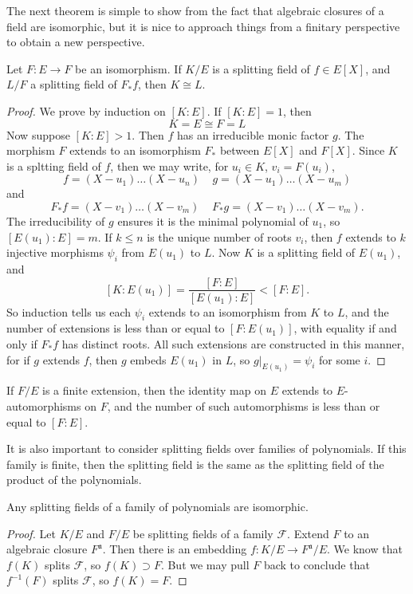 The next theorem is simple to show from the fact that algebraic closures of a field are isomorphic, but it is nice to approach things from a finitary perspective to obtain a new perspective.

\begin{theorem}
    Let $F: E \to F$ be an isomorphism. If $K/E$ is a splitting field of $f \in E[X]$, and $L/F$ a splitting field of $F_* f$, then $K \cong L$.
\end{theorem}
\begin{proof}
    We prove by induction on $[K:E]$. If $[K:E] = 1$, then
    \[ K = E \cong F = L \]
    Now suppose $[K:E] > 1$. Then $f$ has an irreducible monic factor $g$. The morphism $F$ extends to an isomorphism $F_*$ between $E[X]$ and $F[X]$. Since $K$ is a spltting field of $f$, then we may write, for $u_i \in K$, $v_i = F(u_i)$,
    \[ f = (X - u_1) \dots (X - u_n)\ \ \ \ \ g = (X - u_1) \dots (X - u_m) \]
    and
    \[ F_* f = (X - v_1) \dots (X - v_m)\ \ \ \ \ F_* g = (X - v_1) \dots (X - v_m). \]
    The irreducibility of $g$ ensures it is the minimal polynomial of $u_1$, so $[E(u_1): E] = m$. If $k \leq n$ is the unique number of roots $v_i$, then $f$ extends to $k$ injective morphisms $\psi_i$ from $E(u_1)$ to $L$. Now $K$ is a splitting field of $E(u_1)$, and
    \[ [K:E(u_1)] = \frac{[F:E]}{[E(u_1):E]} < [F:E]. \]
    So induction tells us each $\psi_i$ extends to an isomorphism from $K$ to $L$, and the number of extensions is less than or equal to $[F:E(u_1)]$, with equality if and only if $F_* f$ has distinct roots. All such extensions are constructed in this manner, for if $g$ extends $f$, then $g$ embeds $E(u_1)$ in $L$, so $g|_{E(u_1)} = \psi_i$ for some $i$.
\end{proof}

\begin{corollary}
    If $F/E$ is a finite extension, then the identity map on $E$ extends to $E$-automorphisms on $F$, and the number of such automorphisms is less than or equal to $[F:E]$.
\end{corollary}

It is also important to consider splitting fields over families of polynomials. If this family is finite, then the splitting field is the same as the splitting field of the product of the polynomials.

\begin{theorem}
    Any splitting fields of a family of polynomials are isomorphic.
\end{theorem}
\begin{proof}
    Let $K/E$ and $F/E$ be splitting fields of a family $\mathcal{F}$. Extend $F$ to an algebraic closure $F^{\mathfrak{a}}$. Then there is an embedding $f:K/E \to F^{\mathfrak{a}}/E$. We know that $f(K)$ splits $\mathcal{F}$, so $f(K) \supset F$. But we may pull $F$ back to conclude that $f^{-1}(F)$ splits $\mathcal{F}$, so $f(K) = F$.
\end{proof}


